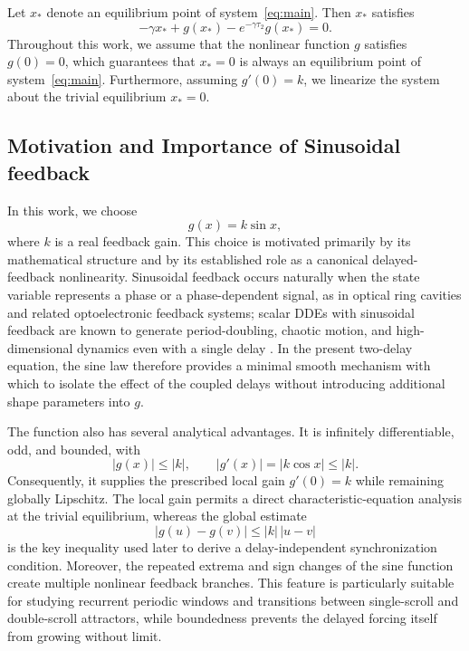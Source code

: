 \documentclass[11pt]{article}
\theoremstyle{remark}
\begin{document}
Let $x_*$ denote an equilibrium point of system~\eqref{eq:main}. Then $x_*$ satisfies
\[
-\gamma x_* + g(x_*) - e^{-\gamma \tau_2} g(x_*) = 0.
\]
Throughout this work, we assume that the nonlinear function $g$ satisfies $g(0)=0$, which guarantees that $x_*=0$ is always an equilibrium point of system~\eqref{eq:main}. Furthermore, assuming $g'(0)=k$, we linearize the system about the trivial equilibrium $x_*=0$.

{
\subsection*{Motivation and Importance of Sinusoidal feedback}
In this work, we choose
\[
g(x)=k\sin x,
\]
where $k$ is a real feedback gain. This choice is motivated primarily by its mathematical structure and by its established role as a canonical delayed-feedback nonlinearity. Sinusoidal feedback occurs naturally when the state variable represents a phase or a phase-dependent signal, as in optical ring cavities and related optoelectronic feedback systems; scalar DDEs with sinusoidal feedback are known to generate period-doubling, chaotic motion, and high-dimensional dynamics even with a single delay \cite{sprott2007simple}. In the present two-delay equation, the sine law therefore provides a minimal smooth mechanism with which to isolate the effect of the coupled delays without introducing additional shape parameters into $g$.

The function also has several analytical advantages. It is infinitely differentiable, odd, and bounded, with
\[
|g(x)|\leq |k|, \qquad |g'(x)|=|k\cos x|\leq |k|.
\]
Consequently, it supplies the prescribed local gain $g'(0)=k$ while remaining globally Lipschitz. The local gain permits a direct characteristic-equation analysis at the trivial equilibrium, whereas the global estimate
\[
|g(u)-g(v)|\leq |k|\,|u-v|
\]
is the key inequality used later to derive a delay-independent synchronization condition. Moreover, the repeated extrema and sign changes of the sine function create multiple nonlinear feedback branches. This feature is particularly suitable for studying recurrent periodic windows and transitions between single-scroll and double-scroll attractors, while boundedness prevents the delayed forcing itself from growing without limit.

}
\end{document}
